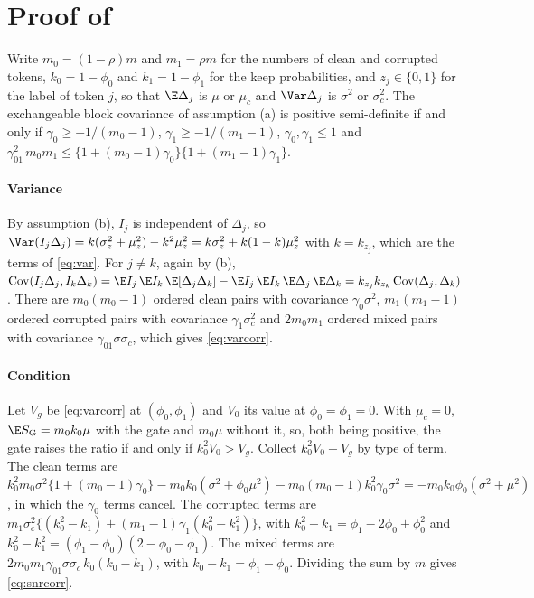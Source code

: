\section{Proof of }\label{app:snrcorr}
Write $m_0=(1-\rho)m$ and $m_1=\rho m$ for the numbers of clean and corrupted tokens, $k_0=1-\phi_0$ and $k_1=1-\phi_1$ for the keep
probabilities, and $z_j\in\{0,1\}$ for the label of token $j$, so that $\E\Delta_j$ is $\mu$ or $\mu_c$ and $\Var\Delta_j$ is $\sigma^2$ or
$\sigma_c^2$.
The exchangeable block covariance of assumption (a) is positive semi-definite if and only if $\gamma_0\ge-1/(m_0-1)$,
$\gamma_1\ge-1/(m_1-1)$, $\gamma_0,\gamma_1\le1$ and $\gamma_{01}^2\,m_0m_1\le\{1+(m_0-1)\gamma_0\}\{1+(m_1-1)\gamma_1\}$.

\paragraph*{Variance}
By assumption (b), $I_j$ is independent of $\Delta_j$, so
$\Var(I_j\Delta_j)=k(\sigma_z^2+\mu_z^2)-k^2\mu_z^2=k\sigma_z^2+k(1-k)\mu_z^2$ with $k=k_{z_j}$, which are the terms of \cref{eq:var}.
For $j\neq k$, again by (b),
$\mathrm{Cov}(I_j\Delta_j,I_k\Delta_k)=\E I_j\,\E I_k\,\E[\Delta_j\Delta_k]-\E I_j\,\E I_k\,\E\Delta_j\,\E\Delta_k=k_{z_j}k_{z_k}\,\mathrm{Cov}(\Delta_j,\Delta_k)$.
There are $m_0(m_0-1)$ ordered clean pairs with covariance $\gamma_0\sigma^2$, $m_1(m_1-1)$ ordered corrupted pairs with covariance
$\gamma_1\sigma_c^2$ and $2m_0m_1$ ordered mixed pairs with covariance $\gamma_{01}\sigma\sigma_c$, which gives \cref{eq:varcorr}.

\paragraph*{Condition}
Let $V_g$ be \cref{eq:varcorr} at $(\phi_0,\phi_1)$ and $V_0$ its value at $\phi_0=\phi_1=0$.
With $\mu_c=0$, $\E S_{\rm G}=m_0k_0\mu$ with the gate and $m_0\mu$ without it, so, both being positive, the gate raises the ratio if and
only if $k_0^2V_0>V_g$.
Collect $k_0^2V_0-V_g$ by type of term.
The clean terms are
$k_0^2m_0\sigma^2\{1+(m_0-1)\gamma_0\}-m_0k_0(\sigma^2+\phi_0\mu^2)-m_0(m_0-1)k_0^2\gamma_0\sigma^2=-m_0k_0\phi_0(\sigma^2+\mu^2)$,
in which the $\gamma_0$ terms cancel.
The corrupted terms are $m_1\sigma_c^2\{(k_0^2-k_1)+(m_1-1)\gamma_1(k_0^2-k_1^2)\}$, with $k_0^2-k_1=\phi_1-2\phi_0+\phi_0^2$ and
$k_0^2-k_1^2=(\phi_1-\phi_0)(2-\phi_0-\phi_1)$.
The mixed terms are $2m_0m_1\gamma_{01}\sigma\sigma_c\,k_0(k_0-k_1)$, with $k_0-k_1=\phi_1-\phi_0$.
Dividing the sum by $m$ gives \cref{eq:snrcorr}.

